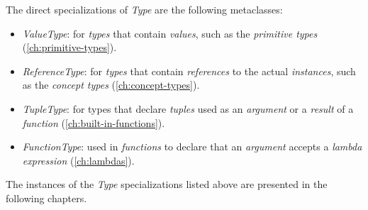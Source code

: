 The direct specializations of \emph{Type} are the following metaclasses:

\begin{itemize}
  \item \emph{ValueType}: for \emph{types} that contain \emph{values},
  such as the \emph{primitive types} (\ref{ch:primitive-types}).
  \item \emph{ReferenceType}: for \emph{types} that contain \emph{references}
  to the actual \emph{instances},
  such as the \emph{concept types} (\ref{ch:concept-types}).
  \item \emph{TupleType}: for types that declare \emph{tuples} used
  as an \emph{argument} or a \emph{result} of a \emph{function} (\ref{ch:built-in-functions}).
  \item \emph{FunctionType}: used in \emph{functions} to declare that
  an \emph{argument} accepts a \emph{lambda expression} (\ref{ch:lambdas}).
\end{itemize}

The instances of the \emph{Type} specializations listed above
are presented in the following chapters.
